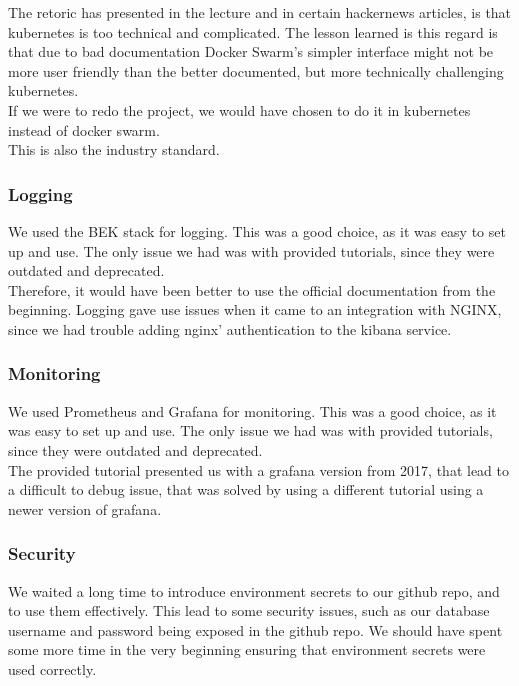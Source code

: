 The retoric has presented in the lecture and in certain hackernews articles, is that kubernetes is too technical and complicated.
The lesson learned is this regard is that due to bad documentation Docker Swarm's simpler interface might not be more user friendly than the
better documented, but more technically challenging kubernetes.\\

If we were to redo the project, we would have chosen to do it in kubernetes instead of docker swarm.\\ This is also the industry standard.

\subsubsection{Logging}
We used the BEK stack for logging. This was a good choice, as it was easy to set up and use. The only issue we had was with provided tutorials,
since they were outdated and deprecated.\\ Therefore, it would have been better to use the official documentation from the beginning.
Logging gave use issues when it came to an integration with NGINX, since we had trouble adding nginx' authentication to the kibana service.

\subsubsection{Monitoring}
We used Prometheus and Grafana for monitoring. This was a good choice, as it was easy to set up and use. The only issue we had was with provided tutorials,
since they were outdated and deprecated.\\ The provided tutorial presented us with a grafana version from 2017, that lead to a difficult to debug issue, that
was solved by using a different tutorial using a newer version of grafana.\\

\subsubsection{Security}
We waited a long time to introduce environment secrets to our github repo, and to use them effectively.
This lead to some security issues, such as our database username and password being exposed in the github repo.
We should have spent some more time in the very beginning ensuring that environment secrets were used correctly.\\


